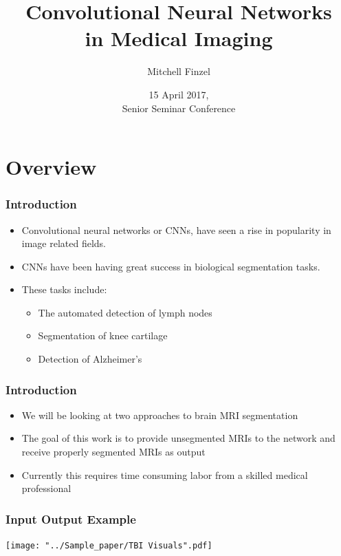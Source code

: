 \documentclass{beamer}
\title[CNNs in Medical Imaging]{Convolutional Neural Networks \\ in Medical Imaging}
\author[Finzel]{Mitchell Finzel}
\institute[U of Minn, Morris]
{
  Division of Science and Mathematics \\
  University of Minnesota, Morris \\
  Morris, Minnesota, USA
}
\date[April '17] %
{15 April 2017, \\ Senior Seminar Conference}
\begin{document}
\begin{frame}
  \titlepage
\end{frame}


\section*{Overview}

\begin{frame}
  \frametitle{Introduction}
  \tableofcontents[hideallsubsections]
  \begin{itemize}
  	\item Convolutional neural networks or CNNs, have seen a rise in popularity in image related fields.
  	\item CNNs have been having great success in biological segmentation tasks.
  	\item These tasks include:
  	\begin{itemize}
  	  \item The automated detection of lymph nodes
  	  \item Segmentation of knee cartilage
  	  \item Detection of Alzheimer's
  	\end{itemize}
  \end{itemize}
\end{frame}

\begin{frame}
  \frametitle{Introduction}
  \tableofcontents[hideallsubsections]
  \begin{itemize}
	\item We will be looking at two approaches to brain MRI segmentation
	\item The goal of this work is to provide unsegmented MRIs to the network and receive properly segmented MRIs as output
	\item Currently this requires time consuming labor from a skilled medical professional
  \end{itemize}
\end{frame}

\begin{frame} 
	\frametitle{Input Output Example}
    \texttt{[image: "../Sample\_paper/TBI Visuals".pdf]}
    \\
\end{frame}
\end{document}
